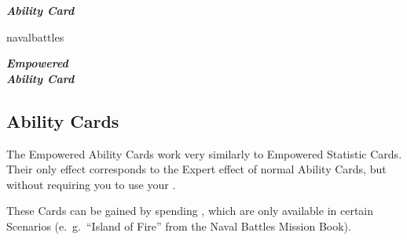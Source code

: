 \vspace*{2em}
\begin{paracol}{2}
  \begin{expansion}[title=\phantom{\textbf{\tiny{foo}}}, overlay={}]{}
    \footnotesize
    \begin{center}
      \begin{scriptsize}
      \end{scriptsize}
      \textbf{\textit{\textcolor{darkcandyapplered}{Ability Card\\\phantom{Blah}}}}
    \end{center}
  \end{expansion}
  \switchcolumn
  \begin{expansion}{navalbattles}
    \hspace*{-2.3mm}
    \begin{minipage}[t]{0.3\linewidth}
      \footnotesize
      \vspace*{0mm}
      \begin{center}
        \begin{scriptsize}
        \end{scriptsize}
        \textbf{\textit{\textcolor{darkcandyapplered}{Empowered\\Ability Card}}}
      \end{center}
    \end{minipage}
    \hfill
    \begin{minipage}[t]{0.65\linewidth}
      \subsection*{ Ability Cards}
      The Empowered Ability Cards work very similarly to Empowered Statistic Cards.
      Their only effect corresponds to the Expert effect of normal Ability Cards, but without requiring you to use your .

      \medskip
      These Cards can be gained by spending , which are only available in certain Scenarios (e.~g.~``Island of Fire'' from the Naval Battles Mission Book).
    \end{minipage}
  \end{expansion}
\end{paracol}

